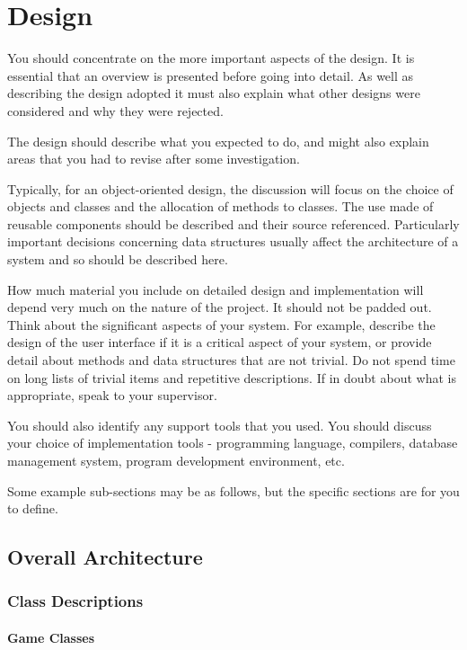 \chapter{Design}

You should concentrate on the more important aspects of the design. It is essential that an overview is presented before going into detail. As well as describing the design adopted it must also explain what other designs were considered and why they were rejected.

The design should describe what you expected to do, and might also explain areas that you had to revise after some investigation.

Typically, for an object-oriented design, the discussion will focus on the choice of objects and classes and the allocation of methods to classes. The use made of reusable components should be described and their source referenced. Particularly important decisions concerning data structures usually affect the architecture of a system and so should be described here.

How much material you include on detailed design and implementation will depend very much on the nature of the project. It should not be padded out. Think about the significant aspects of your system. For example, describe the design of the user interface if it is a critical aspect of your system, or provide detail about methods and data structures that are not trivial. Do not spend time on long lists of trivial items and repetitive descriptions. If in doubt about what is appropriate, speak to your supervisor.
 
You should also identify any support tools that you used. You should discuss your choice of implementation tools - programming language, compilers, database management system, program development environment, etc.

Some example sub-sections may be as follows, but the specific sections are for you to define. 

\section{Overall Architecture}
\subsection{Class Descriptions}
\subsubsection{Game Classes}
